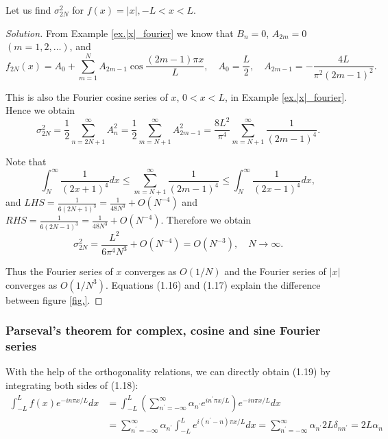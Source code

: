 \begin{example}[]
Let us find $\sigma_{2 N}^2$ for $f(x)=|x|,-L<x<L$.
\end{example}
\begin{proof}[Solution]
From Example \ref{ex.|x|_fourier} we know that $B_n=0$, $A_{2 m}=0$ $(m=1,2, \ldots)$, and
$$
f_{2 N}(x)=A_0+\sum_{m=1}^N A_{2 m-1} \cos \frac{(2 m-1) \pi x}{L}, \quad A_0=\frac{L}{2}, \quad A_{2 m-1}=-\frac{4 L}{\pi^2(2 m-1)^2} .
$$

This is also the Fourier cosine series of $x$, $0<x<L$, in Example \ref{ex.|x|_fourier}. Hence we obtain
$$
\sigma_{2 N}^2=\frac{1}{2} \sum_{n=2 N+1}^{\infty} A_n^2=\frac{1}{2} \sum_{m=N+1}^{\infty} A_{2 m-1}^2=\frac{8 L^2}{\pi^4} \sum_{m=N+1}^{\infty} \frac{1}{(2 m-1)^4} .
$$

Note that
$$
\int_N^{\infty} \frac{1}{(2 x+1)^4} d x \leq \sum_{m=N+1}^{\infty} \frac{1}{(2 m-1)^4} \leq \int_N^{\infty} \frac{1}{(2 x-1)^4} d x,
$$
and $\textit{LHS}=\frac{1}{6(2 N+1)^3}=\frac{1}{48 N^3}+O\left(N^{-4}\right)$ and $\textit{RHS}=\frac{1}{6(2 N-1)^3}=\frac{1}{48 N^3}+O\left(N^{-4}\right)$.
Therefore we obtain
\begin{equation}\label{eq.|x|_fourier_mse_converge}
    \sigma_{2 N}^2=\frac{L^2}{6 \pi^4 N^3}+O\left(N^{-4}\right)=O\left(N^{-3}\right), \quad N \rightarrow \infty .
\end{equation}

Thus the Fourier series of $x$ converges as $O(1 / N)$ and the Fourier series of $|x|$ converges as $O\left(1 / N^3\right)$. Equations (1.16) and (1.17) explain the difference between figure \ref{fig.}.
\end{proof}

\subsubsection{Parseval's theorem for complex, cosine and sine Fourier series}










With the help of the orthogonality relations, we can directly obtain (1.19) by integrating both sides of (1.18):
$$
\begin{aligned}
\int_{-L}^L f(x) e^{-i n \pi x / L} d x & =\int_{-L}^L\left(\sum_{n^{\prime}=-\infty}^{\infty} \alpha_{n^{\prime}} e^{i n^{\prime} \pi x / L}\right) e^{-i n \pi x / L} d x \\
& =\sum_{n^{\prime}=-\infty}^{\infty} \alpha_{n^{\prime}} \int_{-L}^L e^{i\left(n^{\prime}-n\right) \pi x / L} d x=\sum_{n^{\prime}=-\infty}^{\infty} \alpha_{n^{\prime}} 2 L \delta_{n n^{\prime}}=2 L \alpha_n
\end{aligned}
$$

